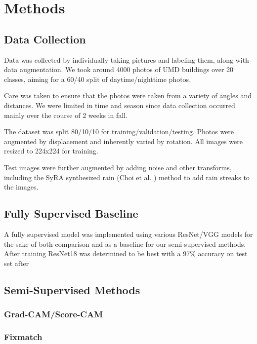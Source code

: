 \documentclass{article}
\begin{document}
\section{Methods}
\label{method}

\subsection{Data Collection}

Data was collected by individually taking pictures and labeling them, along with data augmentation. We took around 4000 photos of UMD buildings over 20 classes, aiming for a 60/40 split of daytime/nighttime photos.

Care was taken to ensure that the photos were taken from a variety of angles and distances. We were limited in time and season since data collection occurred mainly over the course of 2 weeks in fall. 

The dataset was split 80/10/10 for training/validation/testing. Photos were augmented by displacement and inherently varied by rotation. All images were resized to 224x224 for training. 

Test images were further augmented by adding noise and other transforms, including the SyRA synthesized rain (Choi et al. \cite{choi}) method to add rain streaks to the images. 

\subsection{Fully Supervised Baseline}

A fully supervised model was implemented using various ResNet/VGG models for the sake of both comparison and as a baseline for our semi-supervised methods. After training ResNet18 was determined to be best with a 97\% accuracy on test set after %

\subsection{Semi-Supervised Methods}

\subsubsection{Grad-CAM/Score-CAM}

\subsubsection{Fixmatch}
\end{document}
